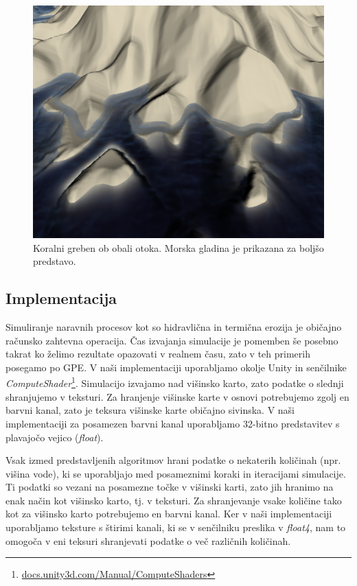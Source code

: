 \documentclass[9pt]{pnas-new}
\begin{document}
\begin{figure}
	\centering
	\includegraphics[width=\linewidth]{example_coral_reef}
	\caption{Koralni greben ob obali otoka. Morska gladina je prikazana za boljšo predstavo.}
	\label{fig:coral_reef_example}
\end{figure}

\subsection*{Implementacija}
Simuliranje naravnih procesov kot so hidravlična in termična erozija je običajno računsko zahtevna operacija. Čas izvajanja simulacije je pomemben še posebno takrat ko želimo rezultate opazovati v realnem času, zato v teh primerih posegamo po GPE. V naši implementaciji uporabljamo okolje Unity in senčilnike \textit{ComputeShader}\footnote{\href{https://docs.unity3d.com/Manual/ComputeShaders.html}{docs.unity3d.com/Manual/ComputeShaders}}. Simulacijo izvajamo nad višinsko karto, zato podatke o slednji shranjujemo v teksturi. Za hranjenje višinske karte v osnovi potrebujemo zgolj en barvni kanal, zato je teksura višinske karte običajno sivinska. V naši implementaciji za posamezen barvni kanal uporabljamo 32-bitno predstavitev s plavajočo vejico (\emph{float}).

Vsak izmed predstavljenih algoritmov hrani podatke o nekaterih količinah (npr. višina vode), ki se uporabljajo med posameznimi koraki in iteracijami simulacije. Ti podatki so vezani na posamezne točke v višinski karti, zato jih hranimo na enak način kot višinsko karto, tj. v teksturi. Za shranjevanje vsake količine tako kot za višinsko karto potrebujemo en barvni kanal. Ker v naši implementaciji uporabljamo teksture s štirimi kanali, ki se v senčilniku preslika v \textit{float4}, nam to omogoča v eni teksuri shranjevati podatke o več različnih količinah.
\end{document}
